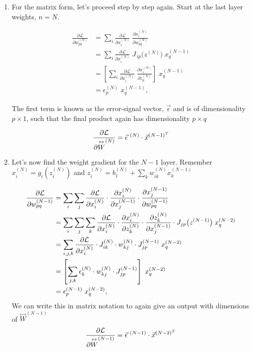 \documentclass{article}
\begin{document}
\begin{enumerate}
\begin{enumerate}
        \begin{enumerate}
        \item For the matrix form, let's proceed step by step again. Start at the last layer weights, $n=N$.

        \begin{align*}
        \frac{\partial \mathcal{L}}{\partial w_{pq}^{(N)}}
        &= \sum_i \frac{\partial \mathcal{L}}{\partial x_i^{(N)}}\;\frac{\partial x_i^{(N)}}{\partial w_{pq}^{(N)}}\\
        &= \sum_i \frac{\partial \mathcal{L}}{\partial x_i^{(N)}}\;J_{\,i p}\bigl(z^{(N)}\bigr)\;x_q^{(N-1)}\\
        &= \left[\sum_i \frac{\partial \mathcal{L}}{\partial x_i^{(N)}}\;\frac{\partial x_i^{(N)}}{\partial z_p^{(N)}}\right]\;x_q^{(N-1)}\\
        &= \epsilon_p^{(N)}\;x_q^{(N-1)},
        \end{align*}
        
        The first term is known as the error-signal vector, $\vec{\epsilon}$ and is of dimensionality $p\times 1$, such that the final product again has dimensionality $p\times q$

        \[\pdv{\mathcal{L}}{\overset{\leftrightarrow}{W}^{(N)}} = \vec{\epsilon}^{\ (N)}\cdot \vec{x}^{(N-1)^T}\]

        \item Let's now find the weight gradient for the $N-1$ layer. Remember $x_i^{(N)} = g_i\left(z_i^{(N)}\right)$ and $z_i^{(N)} = b_{1}^{(N)}+\sum_k w_{ik}^{(N)}x_k^{(N-1)}$

        \begin{align*}
            \pdv{\mathcal{L}}{w^{(N-1)}_{pq}} &= \sum_i\sum_j\pdv{\mathcal{L}}{x_i^{(N)}}\cdot \pdv{x_i^{(N)}}{x_j^{(N-1)}}\cdot\pdv{x_j^{(N-1)}}{w_{pq}^{(N-1)}}\\
            &= \sum_i\sum_j\sum_k\pdv{\mathcal{L}}{x_i^{(N)}}\cdot \pdv{x_i^{(N)}}{z_k^{(N)}}\cdot\pdv{z_k^{(N)}}{x_j^{(N-1)}}\cdot J_{j p}\bigl(z^{(N-1)}\bigr)\;x_q^{(N-2)}\\
            &= \sum_{i,j,k}\pdv{\mathcal{L}}{x_i^{(N)}}\cdot J_{ik}^{(N)}\cdot w_{kj}^{(N)}\cdot J_{j p}^{(N-1)}\;x_q^{(N-2)}\\
            &= \left[\sum_{j,k}\epsilon_k^{(N)}\cdot w_{kj}^{(N)}\cdot J_{j p}^{(N-1)}\right]\;x_q^{(N-2)}\\
            &=\epsilon_p^{(N-1)}\;x_q^{(N-2)},
        \end{align*}
        We can write this in matrix notation to again give an output with dimensions of $\overset{\leftrightarrow}{W}^{(N-1)}$
         \[\pdv{\mathcal{L}}{\overset{\leftrightarrow}{W}^{(N-1)}} = \vec{\epsilon}^{\ (N-1)}\cdot\vec{x}^{(N-2)^T}\]



\end{enumerate}
\end{enumerate}
\end{enumerate}
\end{document}
